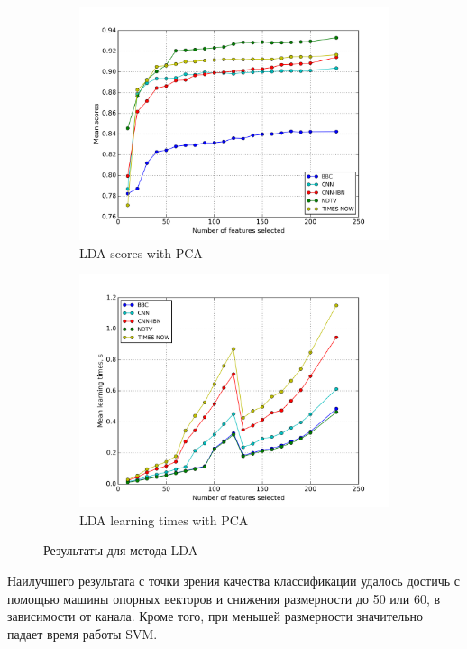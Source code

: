 \begin{figure}[h!]
    \centering
	\begin{subfigure}{0.45\textwidth}
		\includegraphics[width=\textwidth]{images/PCA-LDA.png}
		\caption{LDA scores with PCA}
	\end{subfigure}
	\begin{subfigure}{0.45\textwidth}
		\includegraphics[width=\textwidth]{images/PCA-LDATime.png}
		\caption{LDA learning times with PCA}
	\end{subfigure}
	\caption{Результаты для метода LDA}\label{fig:lda_pca}
\end{figure}

\par
Наилучшего результата с точки зрения качества классификации удалось достичь с помощью машины опорных векторов и снижения размерности до 50 или 60, в зависимости от канала. Кроме того, при меньшей размерности значительно падает время работы SVM.

